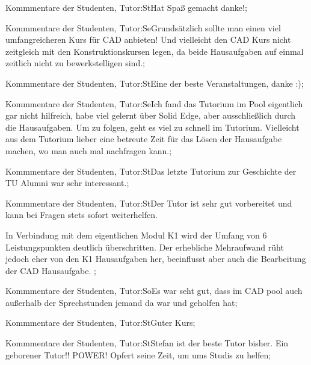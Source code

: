 \documentclass[10pt]{beamer}
\begin{document}
\begin{frame}[fragile]{Kommmentare der Studenten, Tutor:St}Hat Spaß gemacht danke!;
 \end{frame}
\begin{frame}[fragile]{Kommmentare der Studenten, Tutor:Se}Grundsätzlich sollte man einen viel umfangreicheren Kurs für CAD anbieten!  Und vielleicht den CAD Kurs nicht zeitgleich mit den Konstruktionskursen legen, da beide Hausaufgaben auf einmal zeitlich nicht zu bewerkstelligen sind.;
 \end{frame}
\begin{frame}[fragile]{Kommmentare der Studenten, Tutor:St}Eine der beste Veranstaltungen, danke :);
 \end{frame}
\begin{frame}[fragile]{Kommmentare der Studenten, Tutor:Se}Ich fand das Tutorium im Pool eigentlich gar nicht hilfreich, habe viel gelernt über Solid Edge, aber ausschließlich durch die Hausaufgaben. Um zu folgen, geht es viel zu schnell im Tutorium. Vielleicht aus dem Tutorium lieber eine betreute Zeit für das Lösen der Hausaufgabe machen, wo man auch mal nachfragen kann.;
 \end{frame}
\begin{frame}[fragile]{Kommmentare der Studenten, Tutor:St}Das letzte Tutorium zur Geschichte der TU Alumni war sehr interessant.;
 \end{frame}
\begin{frame}[fragile]{Kommmentare der Studenten, Tutor:St}Der Tutor ist sehr gut vorbereitet und kann bei Fragen stets sofort weiterhelfen. 
 
 In Verbindung mit dem eigentlichen Modul K1 wird der Umfang von 6 Leistungspunkten deutlich überschritten. Der erhebliche Mehraufwand rüht jedoch eher von den K1 Hausaufgaben her, beeinflusst aber auch die Bearbeitung der CAD Hausaufgabe. ;
 \end{frame}
\begin{frame}[fragile]{Kommmentare der Studenten, Tutor:So}Es war seht gut, dass im CAD pool auch außerhalb der Sprechstunden jemand da war und geholfen hat;
 \end{frame}
\begin{frame}[fragile]{Kommmentare der Studenten, Tutor:St}Guter Kurs;
 \end{frame}
\begin{frame}[fragile]{Kommmentare der Studenten, Tutor:St}Stefan ist der beste Tutor bisher. Ein geborener Tutor!! POWER! Opfert seine Zeit, um ums Studis zu helfen;
 \end{frame}
\end{document}
